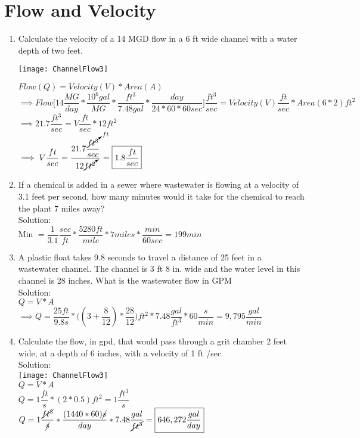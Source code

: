 \documentclass{article}
\begin{document}
\section{Flow and Velocity}
\begin{enumerate}
\item Calculate the velocity of a 14 MGD flow in a 6 ft wide channel with a water depth of two feet.\\
\begin{center}
\texttt{[image: ChannelFlow3]}
\end{center}
$Flow (Q) = Velocity (V) * Area (A)$\\
$\implies Flow\Big[ 14 \dfrac{MG}{day}* \dfrac{10^6 gal}{MG} * \dfrac{ft^3}{7.48 gal}*\dfrac{day}{24*60*60sec}\Big]\dfrac{ft^3}{sec} = Velocity(V) \dfrac{ft}{sec}* Area (6 * 2) ft ^2$\\
\vspace{0.2cm}
$\implies 21.7 \dfrac{ft^3}{sec}= V\dfrac{ft}{sec}*12ft^2$\\
$\implies V \dfrac{ft}{sec}= \dfrac{21.7\dfrac{\cancelto{ft}{ft^3}}{sec}}{12\cancelto{}{ft^2}}= \boxed{1.8\dfrac{ft}{sec}}$\\

\item If a chemical is added in a sewer where wastewater is flowing at a velocity of 3.1 feet per second, how many minutes would it take for the chemical to reach the plant 7 miles away?\\
Solution:\\
Min $= \dfrac{1}{3.1}\dfrac{sec}{ft}*\dfrac{5280ft}{mile}*7 miles*\dfrac{min}{60 sec} = \boxed{199 min}$
\\

\item A plastic float takes 9.8 seconds to travel a distance of 25 feet in a wastewater channel. The channel is 3 ft 8 in. wide and the water level in this channel is 28 inches. What is the wastewater flow in GPM\\
Solution:\\
\vspace{0.3cm}
$Q=V*A$\\
$\implies Q=\dfrac{25ft}{9.8s}*\Big((3+\dfrac{8}{12})*\dfrac{28}{12}\Big)ft^2*7.48\dfrac{gal}{ft^3}*60\dfrac{s}{min}=\boxed{9,795\dfrac{gal}{min}}$



\item Calculate the flow, in gpd, that would pass through a grit chamber 2 feet wide, at a depth of 6 inches, with a velocity of 1 ft /sec\\
Solution:\\
\texttt{[image: ChannelFlow3]}\\
$Q=V*A$\\
$Q=1\dfrac{ft}{s}*(2*0.5)ft^2=1\dfrac{ft^3}{s}$\\
$Q=1\dfrac{\cancel{ft^3}}{\cancel{s}}*\dfrac{(1440*60)\cancel{s}}{day}*7.48\dfrac{gal}{\cancel{ft^3}}=\boxed{646,272\dfrac{gal}{day}}$
\end{enumerate}
\end{document}
